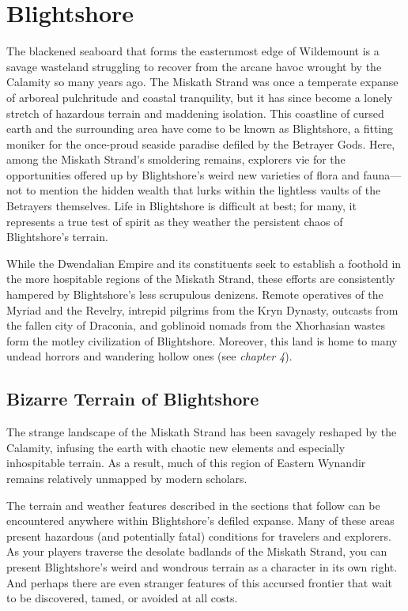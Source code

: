 \documentclass[10pt,a4paper,twoside,bg=print,twocolumn,openany,nodeprecatedcode]{dndbook}
\begin{document}
\section{Blightshore}
The blackened seaboard that forms the easternmost edge of Wildemount is a savage wasteland struggling to recover from the arcane havoc wrought by the Calamity so many years ago. The Miskath Strand was once a temperate expanse of arboreal pulchritude and coastal tranquility, but it has since become a lonely stretch of hazardous terrain and maddening isolation. This coastline of cursed earth and the surrounding area have come to be known as Blightshore, a fitting moniker for the once-proud seaside paradise defiled by the Betrayer Gods. Here, among the Miskath Strand's smoldering remains, explorers vie for the opportunities offered up by Blightshore's weird new varieties of flora and fauna—not to mention the hidden wealth that lurks within the lightless vaults of the Betrayers themselves. Life in Blightshore is difficult at best; for many, it represents a true test of spirit as they weather the persistent chaos of Blightshore's terrain.

While the Dwendalian Empire and its constituents seek to establish a foothold in the more hospitable regions of the Miskath Strand, these efforts are consistently hampered by Blightshore's less scrupulous denizens. Remote operatives of the Myriad and the Revelry, intrepid pilgrims from the Kryn Dynasty, outcasts from the fallen city of Draconia, and goblinoid nomads from the Xhorhasian wastes form the motley civilization of Blightshore. Moreover, this land is home to many undead horrors and wandering hollow ones (see \textit{chapter 4}).

\subsection{Bizarre Terrain of Blightshore}
The strange landscape of the Miskath Strand has been savagely reshaped by the Calamity, infusing the earth with chaotic new elements and especially inhospitable terrain. As a result, much of this region of Eastern Wynandir remains relatively unmapped by modern scholars.

The terrain and weather features described in the sections that follow can be encountered anywhere within Blightshore's defiled expanse. Many of these areas present hazardous (and potentially fatal) conditions for travelers and explorers. As your players traverse the desolate badlands of the Miskath Strand, you can present Blightshore's weird and wondrous terrain as a character in its own right. And perhaps there are even stranger features of this accursed frontier that wait to be discovered, tamed, or avoided at all costs.
\end{document}
